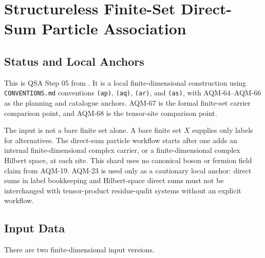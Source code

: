 
\section{Structureless Finite-Set Direct-Sum Particle Association}
\label{sec:qsa-finite-set-direct-sum-particle}

\subsection{Status and Local Anchors}

This is QSA Step 05 from
.  It is a local
finite-dimensional construction using \texttt{CONVENTIONS.md} conventions
\texttt{(ap)}, \texttt{(aq)}, \texttt{(ar)}, and \texttt{(as)}, with
AQM-64--AQM-66 as the planning and catalogue anchors.  AQM-67 is the formal
finite-set carrier comparison point, and AQM-68 is the tensor-site comparison
point.

The input is not a bare finite set alone.  A bare finite set \(X\) supplies
only labels for alternatives.  The direct-sum particle workflow starts after
one adds an internal finite-dimensional complex carrier, or a finite-dimensional
complex Hilbert space, at each site.  This shard uses no canonical boson or
fermion field claim from AQM-19.  AQM-23 is used only as a cautionary local
anchor: direct sums in label bookkeeping and Hilbert-space direct sums must
not be interchanged with tensor-product residue-qudit systems without an
explicit workflow.

\subsection{Input Data}

There are two finite-dimensional input versions.

